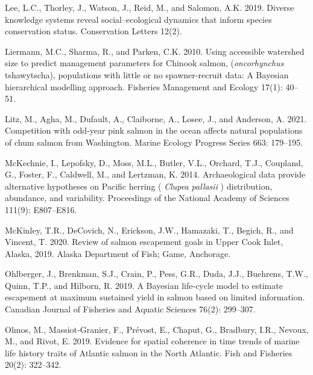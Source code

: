 \documentclass[11pt]{book}
\begin{document}
\begin{CSLReferences}{1}{0}
%
Lee, L.C., Thorley, J., Watson, J., Reid, M., and Salomon, A.K. 2019. Diverse knowledge systems reveal social--ecological dynamics that inform species conservation status. Conservation Letters 12(2).

%
Liermann, M.C., Sharma, R., and Parken, C.K. 2010. Using accessible watershed size to predict management parameters for {Chinook} salmon, (\emph{oncorhynchus} tshawytscha), populations with little or no spawner-recruit data: A {Bayesian} hierarchical modelling approach. Fisheries Management and Ecology 17(1): 40--51.

%
Litz, M., Agha, M., Dufault, A., Claiborne, A., Losee, J., and Anderson, A. 2021. Competition with odd-year pink salmon in the ocean affects natural populations of chum salmon from {Washington}. Marine Ecology Progress Series 663: 179--195.

%
McKechnie, I., Lepofsky, D., Moss, M.L., Butler, V.L., Orchard, T.J., Coupland, G., Foster, F., Caldwell, M., and Lertzman, K. 2014. Archaeological data provide alternative hypotheses on {Pacific} herring ( \emph{{Clupea} pallasii} ) distribution, abundance, and variability. Proceedings of the National Academy of Sciences 111(9): E807--E816.

%
McKinley, T.R., DeCovich, N., Erickson, J.W., Hamazaki, T., Begich, R., and Vincent, T. 2020. Review of salmon escapement goals in {Upper} {Cook} {Inlet}, {Alaska}, 2019. Alaska Department of Fish; Game, Anchorage.

%
Ohlberger, J., Brenkman, S.J., Crain, P., Pess, G.R., Duda, J.J., Buehrens, T.W., Quinn, T.P., and Hilborn, R. 2019. A {Bayesian} life-cycle model to estimate escapement at maximum sustained yield in salmon based on limited information. Canadian Journal of Fisheries and Aquatic Sciences 76(2): 299--307.

%
Olmos, M., Massiot‐Granier, F., Prévost, E., Chaput, G., Bradbury, I.R., Nevoux, M., and Rivot, E. 2019. Evidence for spatial coherence in time trends of marine life history traits of {Atlantic} salmon in the {North} {Atlantic}. Fish and Fisheries 20(2): 322--342.


\end{CSLReferences}
\end{document}
